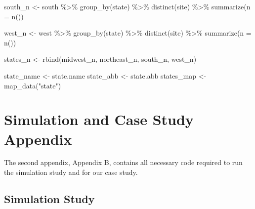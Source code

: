 \documentclass[12pt, twoside]{amherstthesis}
\newenvironment{Shaded}{\begin{snugshade}}{\end{snugshade}}
\newcommand{\AttributeTok}[1]{\textcolor[rgb]{0.77,0.63,0.00}{#1}}
\newcommand{\FunctionTok}[1]{\textcolor[rgb]{0.00,0.00,0.00}{#1}}
\newcommand{\NormalTok}[1]{#1}
\newcommand{\OtherTok}[1]{\textcolor[rgb]{0.56,0.35,0.01}{#1}}
\newcommand{\SpecialCharTok}[1]{\textcolor[rgb]{0.00,0.00,0.00}{#1}}
\newcommand{\StringTok}[1]{\textcolor[rgb]{0.31,0.60,0.02}{#1}}
\begin{document}
\begin{Shaded}
\begin{Highlighting}[]
\NormalTok{south\_n }\OtherTok{\textless{}{-}}\NormalTok{ south }\SpecialCharTok{\%\textgreater{}\%}
  \FunctionTok{group\_by}\NormalTok{(state) }\SpecialCharTok{\%\textgreater{}\%}
  \FunctionTok{distinct}\NormalTok{(site) }\SpecialCharTok{\%\textgreater{}\%}
  \FunctionTok{summarize}\NormalTok{(}\AttributeTok{n =} \FunctionTok{n}\NormalTok{())}

\NormalTok{west\_n }\OtherTok{\textless{}{-}}\NormalTok{ west }\SpecialCharTok{\%\textgreater{}\%}
  \FunctionTok{group\_by}\NormalTok{(state) }\SpecialCharTok{\%\textgreater{}\%}
  \FunctionTok{distinct}\NormalTok{(site) }\SpecialCharTok{\%\textgreater{}\%}
  \FunctionTok{summarize}\NormalTok{(}\AttributeTok{n =} \FunctionTok{n}\NormalTok{())}

\NormalTok{states\_n }\OtherTok{\textless{}{-}} \FunctionTok{rbind}\NormalTok{(midwest\_n, northeast\_n, south\_n, west\_n)}

\NormalTok{state\_name }\OtherTok{\textless{}{-}}\NormalTok{ state.name}
\NormalTok{state\_abb }\OtherTok{\textless{}{-}}\NormalTok{ state.abb}
\NormalTok{states\_map }\OtherTok{\textless{}{-}} \FunctionTok{map\_data}\NormalTok{(}\StringTok{"state"}\NormalTok{)}
\end{Highlighting}
\end{Shaded}
\hypertarget{simulation-and-case-study-appendix}{%
\chapter{Simulation and Case Study Appendix}\label{simulation-and-case-study-appendix}}

The second appendix, Appendix B, contains all necessary code required to run the simulation study and for our case study.

\hypertarget{simulation-study}{%
\section{Simulation Study}\label{simulation-study}}
\end{document}
